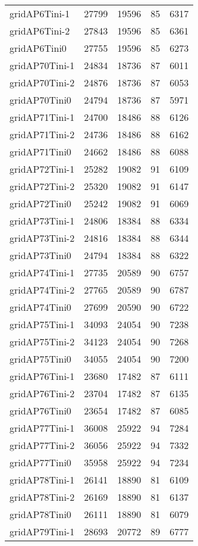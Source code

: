 \begin{longtable}{lrrrr}
gridAP6Tini-1 & 27799 & 19596 & 85 & 6317 \\
gridAP6Tini-2 & 27843 & 19596 & 85 & 6361 \\
gridAP6Tini0 & 27755 & 19596 & 85 & 6273 \\
gridAP70Tini-1 & 24834 & 18736 & 87 & 6011 \\
gridAP70Tini-2 & 24876 & 18736 & 87 & 6053 \\
gridAP70Tini0 & 24794 & 18736 & 87 & 5971 \\
gridAP71Tini-1 & 24700 & 18486 & 88 & 6126 \\
gridAP71Tini-2 & 24736 & 18486 & 88 & 6162 \\
gridAP71Tini0 & 24662 & 18486 & 88 & 6088 \\
gridAP72Tini-1 & 25282 & 19082 & 91 & 6109 \\
gridAP72Tini-2 & 25320 & 19082 & 91 & 6147 \\
gridAP72Tini0 & 25242 & 19082 & 91 & 6069 \\
gridAP73Tini-1 & 24806 & 18384 & 88 & 6334 \\
gridAP73Tini-2 & 24816 & 18384 & 88 & 6344 \\
gridAP73Tini0 & 24794 & 18384 & 88 & 6322 \\
gridAP74Tini-1 & 27735 & 20589 & 90 & 6757 \\
gridAP74Tini-2 & 27765 & 20589 & 90 & 6787 \\
gridAP74Tini0 & 27699 & 20590 & 90 & 6722 \\
gridAP75Tini-1 & 34093 & 24054 & 90 & 7238 \\
gridAP75Tini-2 & 34123 & 24054 & 90 & 7268 \\
gridAP75Tini0 & 34055 & 24054 & 90 & 7200 \\
gridAP76Tini-1 & 23680 & 17482 & 87 & 6111 \\
gridAP76Tini-2 & 23704 & 17482 & 87 & 6135 \\
gridAP76Tini0 & 23654 & 17482 & 87 & 6085 \\
gridAP77Tini-1 & 36008 & 25922 & 94 & 7284 \\
gridAP77Tini-2 & 36056 & 25922 & 94 & 7332 \\
gridAP77Tini0 & 35958 & 25922 & 94 & 7234 \\
gridAP78Tini-1 & 26141 & 18890 & 81 & 6109 \\
gridAP78Tini-2 & 26169 & 18890 & 81 & 6137 \\
gridAP78Tini0 & 26111 & 18890 & 81 & 6079 \\
gridAP79Tini-1 & 28693 & 20772 & 89 & 6777 \\

\end{longtable}
